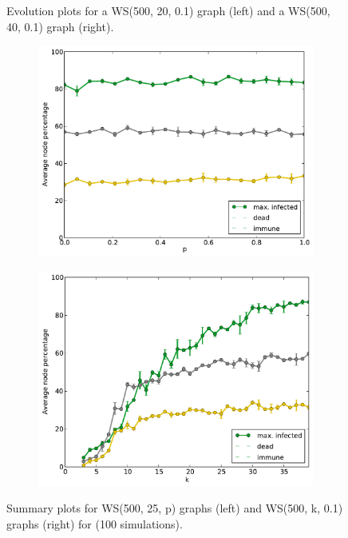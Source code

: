 \documentclass[11pt]{article} %
\begin{document}
\begin{figure}[tb]
\begin{subfigure}[b]{0.5\textwidth}
  \end{subfigure}
  \caption{Evolution plots for a WS(500, 20, 0.1) graph (left) and a
    WS(500, 40, 0.1) graph (right).}
  \label{fig:ws_evo}
\end{figure}

\begin{figure}[tb]
  \begin{subfigure}[b]{0.5\textwidth}
    \centering
    \includegraphics[width=\textwidth]{figures/sum_WS_500_25_p}
  \end{subfigure}
  \begin{subfigure}[b]{0.5\textwidth}
    \centering
    \includegraphics[width=\textwidth]{figures/sum_WS_500_k_01}
  \end{subfigure}
  \caption{Summary plots for WS(500, 25, p) graphs (left) and
    WS(500, k, 0.1) graphs (right) for (100 simulations).}
  \label{fig:ws_sum}
\end{figure}
\end{document}
